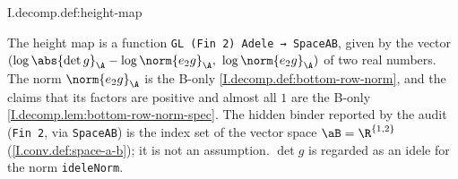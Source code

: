 \begin{definition}
\end{definition}
\begin{tfformal}{I.decomp.def:height-map}
\begin{tffidelity}
The height map is a function \texttt{GL (Fin 2) Adele → SpaceAB}, given by the vector $(\log\abs{\det g}_\A-\log\norm{e_2g}_\A,\ \log\norm{e_2g}_\A)$ of two real numbers. The norm $\norm{e_2g}_\A$ is the B-only \cref{I.decomp.def:bottom-row-norm}, and the claims that its factors are positive and almost all $1$ are the B-only \cref{I.decomp.lem:bottom-row-norm-spec}. The hidden binder reported by the audit (\texttt{Fin 2}, via \texttt{SpaceAB}) is the index set of the vector space $\aB=\R^{\{1,2\}}$ (\cref{I.conv.def:space-a-b}); it is not an assumption. $\det g$ is regarded as an idele for the norm \texttt{ideleNorm}.
\end{tffidelity}
\end{tfformal}

